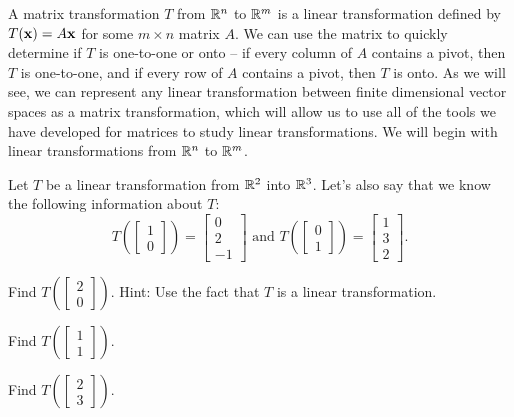 
A matrix transformation $T$ from $\mathbb{R}^n$ to $\mathbb{R}^m$ is a linear transformation defined by $T(\mathbf{x}) = A\mathbf{x}$ for some $m \times n$ matrix $A$. We can use the matrix to quickly determine if $T$ is one-to-one or onto -- if every column of $A$ contains a pivot, then $T$ is one-to-one, and if every row of $A$ contains a pivot, then $T$ is onto. As we will see, we can represent any linear transformation between finite dimensional vector spaces as a matrix transformation, which will allow us to use all of the tools we have developed for matrices to study linear transformations. We will begin with linear transformations from $\mathbb{R}^n$ to $\mathbb{R}^m$. 



\begin{pa} \label{pa:8_b} Let $T$ be a linear transformation from $\mathbb{R}^2$ into $\mathbb{R}^3$. Let's also say that we know the following information about $T$:
\[T\left(\left[ \begin{array}{c} 1 \\ 0 \end{array} \right] \right) = \left[ \begin{array}{r} 0 \\ 2 \\ -1 \end{array} \right] \text{ and }
T\left(\left[ \begin{array}{c} 0 \\ 1 \end{array} \right] \right) = \left[ \begin{array}{r} 1 \\ 3 \\ 2 \end{array} \right].\]
	\be
	\item Find  $T\left(\left[ \begin{array}{c} 2 \\ 0 \end{array} \right] \right)$. Hint: Use the fact that $T$ is a linear transformation.

	\item Find $T\left(\left[ \begin{array}{c} 1 \\ 1 \end{array} \right] \right)$.

	
	\item Find $T\left(\left[ \begin{array}{c} 2 \\ 3 \end{array} \right] \right)$.


\end{pa}
